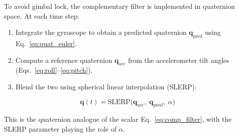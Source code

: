 To avoid gimbal lock, the complementary filter is implemented in quaternion
space. At each time step:

\begin{enumerate}
  \item Integrate the gyroscope to obtain a predicted quaternion
        $\mathbf{q}_\text{pred}$ using Eq.~\eqref{eq:quat_euler}.
  \item Compute a reference quaternion $\mathbf{q}_\text{acc}$ from the
        accelerometer tilt angles (Eqs.~\ref{eq:roll}--\ref{eq:pitch}).
  \item Blend the two using spherical linear interpolation (SLERP):
\end{enumerate}

\begin{equation}
  \mathbf{q}(t) = \text{SLERP}\bigl(\mathbf{q}_\text{acc},\;
                  \mathbf{q}_\text{pred},\; \alpha\bigr)
  \label{eq:slerp_filter}
\end{equation}

\noindent This is the quaternion analogue of the scalar
Eq.~\eqref{eq:comp_filter}, with the SLERP parameter playing the role of
$\alpha$.
